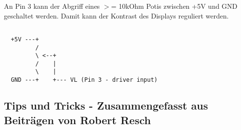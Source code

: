   An Pin 3 kann der Abgriff eines $>$= 10kOhm Potis zwischen +5V und GND 
  geschaltet werden. Damit kann der Kontrast des Displays reguliert werden.

\begin{example}
\begin{verbatim}
  
  +5V ---+
         /
         \ <--+
         /    |
         \    |
  GND ---+    +--- VL (Pin 3 - driver input)
\end{verbatim}
\end{example}


\subsection{Tips und Tricks - Zusammengefasst aus Beiträgen von Robert Resch}

